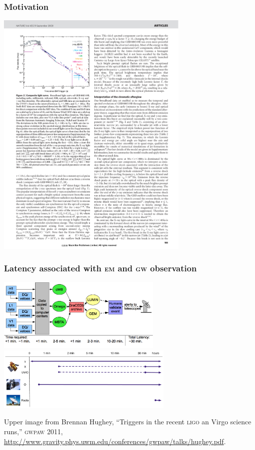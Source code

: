 \documentclass{beamer}
\begin{document}
\begin{frame}
	\frametitle{Motivation}
	\includegraphics[width=0.7\textwidth]{figures/light-curve}
\end{frame}

\begin{frame}
	\frametitle{Latency associated with \textsc{em} and \textsc{gw} observation}
	\begin{center}
		\hspace{.4cm}\includegraphics[width=0.6\textwidth]{figures/Hughey_s6lowlatency_timeline} \\
		\includegraphics[width=0.64\textwidth]{figures/observation_timeline}
	\end{center}
	\scriptsize{Upper image from Brennan Hughey, ``Triggers in the recent \textsc{ligo} an Virgo science runs,'' \textsc{gwpaw} 2011, \url{http://www.gravity.phys.uwm.edu/conferences/gwpaw/talks/hughey.pdf}.}
\end{frame}
\end{document}
